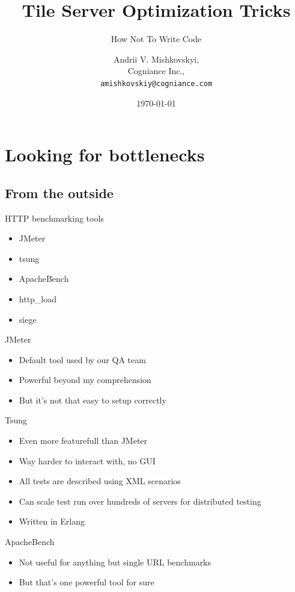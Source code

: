 \documentclass[16pt]{beamer}
\title{Tile Server Optimization Tricks}
\subtitle{How Not To Write Code}
\author{Andrii V. Mishkovskyi,\\
  Cogniance Inc.,\\
  \texttt{amishkovskiy@cogniance.com}}
\date{\today}
\begin{document}
\begin{frame}
  \titlepage
\end{frame}

\begin{frame}
  \tableofcontents
\end{frame}

\section{Looking for bottlenecks}

\subsection{From the outside}

\begin{frame}{HTTP benchmarking tools}
  \begin{itemize}
  \item JMeter
  \item tsung
  \item ApacheBench
  \item http\_load
  \item siege
  \end{itemize}
\end{frame}

\begin{frame}{JMeter}
  \begin{itemize}
  \item Default tool used by our QA team
  \item Powerful beyond my comprehension
  \item But it's not that easy to setup correctly
  \end{itemize}
\end{frame}

\begin{frame}{Tsung}
  \begin{itemize}
  \item Even more featurefull than JMeter
  \item Way harder to interact with, no GUI
  \item All tests are described using XML scenarios
  \item Can scale test run over hundreds of servers for distributed testing
  \item Written in Erlang
  \end{itemize}
\end{frame}

\begin{frame}{ApacheBench}
  \begin{itemize}
  \item Not useful for anything but single URL benchmarks
  \item But that's one powerful tool for sure
  \end{itemize}
\end{frame}
\end{document}
